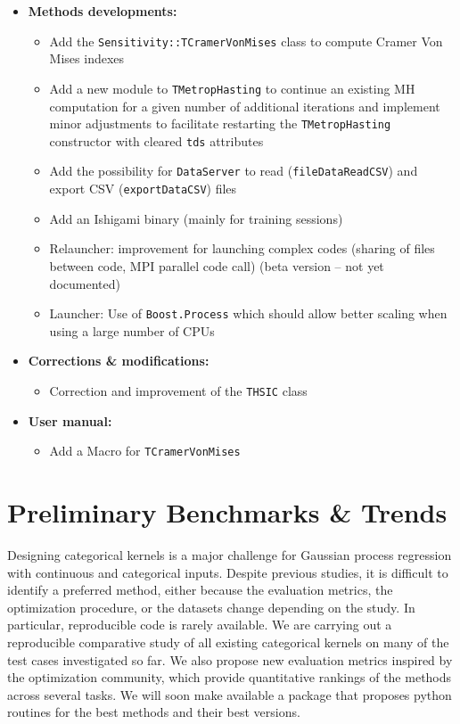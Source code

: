 \begin{itemize}
	\item \textbf{Methods developments:}
	\begin{itemize}
		\item Add the \texttt{Sensitivity::TCramerVonMises} class to compute Cramer Von Mises indexes
    	\item Add a new module to \texttt{TMetropHasting} to continue an existing MH computation for a given number of additional iterations and implement minor adjustments to facilitate restarting the \texttt{TMetropHasting} constructor with cleared \texttt{tds} attributes
    	\item Add the possibility for \texttt{DataServer} to read (\texttt{fileDataReadCSV}) and export CSV (\texttt{exportDataCSV}) files
    	\item Add an Ishigami binary (mainly for training sessions)
    	\item Relauncher: improvement for launching complex codes (sharing of files between code, MPI parallel code call) (beta version -- not yet documented)
    	\item Launcher: Use of \texttt{Boost.Process} which should allow better scaling when using a large number of CPUs
	\end{itemize}
	\item \textbf{Corrections \& modifications:}
	\begin{itemize}
		\item Correction and improvement of the \texttt{THSIC} class
	\end{itemize}
	\item \textbf{User manual:}
	\begin{itemize}
		\item Add a Macro for \texttt{TCramerVonMises}
	\end{itemize}
\end{itemize}


\section{Preliminary Benchmarks \& Trends}


Designing categorical kernels is a major challenge for Gaussian process regression with continuous and categorical inputs. Despite previous studies, it is difficult to identify a preferred method, either because the evaluation metrics,
the optimization procedure, or the datasets change depending on the study. In particular, reproducible code is rarely available. We are carrying out a reproducible comparative study of all existing categorical kernels
on many of the test cases investigated so far. We also propose new evaluation metrics inspired by the optimization
community, which provide quantitative rankings of the methods across several tasks. 
We will soon make available a package that proposes python routines for the best methods and their best versions.



